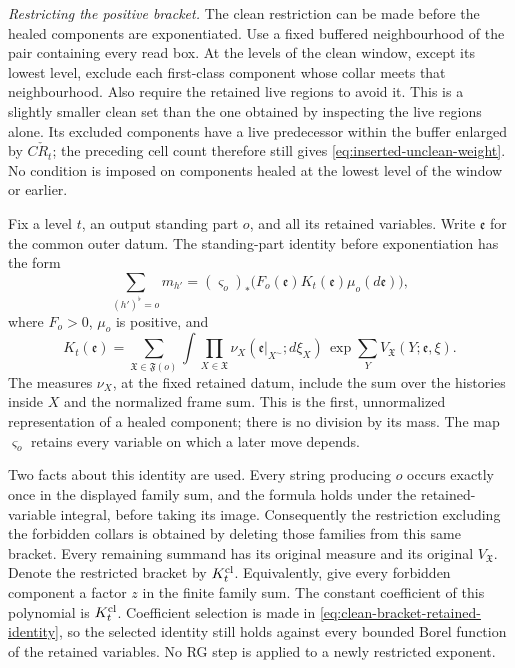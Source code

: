 \documentclass[11pt,letterpaper,reqno]{amsart}
\theoremstyle{definition}
\theoremstyle{remark}
\begin{document}
\emph{Restricting the positive bracket.}
The clean restriction can be made before the healed components are
exponentiated. Use a fixed buffered neighbourhood of the pair
containing every read box. At the levels of the clean window, except
its lowest level, exclude each first-class component whose collar
meets that neighbourhood. Also require the retained live regions to
avoid it. This is a slightly smaller clean set than the one obtained
by inspecting the live regions alone. Its excluded components have a
live predecessor within the buffer enlarged by \(C\check R_t\);
the preceding cell count therefore still gives
\eqref{eq:inserted-unclean-weight}. No condition is imposed on
components healed at the lowest level of the window or earlier.

Fix a level \(t\), an output standing part \(o\), and all its retained
variables. Write \(\mathfrak e\) for the common outer datum. The
standing-part identity before exponentiation has the form
\begin{equation}\label{eq:clean-bracket-retained-identity}
 \sum_{(h')^\flat=o}m_{h'}
 =(\varsigma_o)_*
     \bigl(F_o(\mathfrak e)K_t(\mathfrak e)\mu_o(d\mathfrak e)\bigr),
\end{equation}
where \(F_o>0\), \(\mu_o\) is positive, and
\[
 K_t(\mathfrak e)=
 \sum_{\mathfrak X\in\mathfrak F(o)}
 \int\prod_{X\in\mathfrak X}
       \nu_X(\mathfrak e|_{X^\sim};d\xi_X)\,
        \exp\!\sum_Y V_{\mathfrak X}(Y;\mathfrak e,\xi).
\]
The measures \(\nu_X\), at the fixed retained datum, include the sum
over the histories inside \(X\)
and the normalized frame sum. This is the first, unnormalized
representation of a healed component; there is no division by its
mass. The map \(\varsigma_o\) retains every variable on which a later
move depends.

Two facts about this identity are used. Every string producing \(o\)
occurs exactly once in the displayed family sum, and the formula
holds under the retained-variable integral, before taking its image.
Consequently the restriction excluding the forbidden collars is
obtained by deleting those families from this same bracket. Every
remaining summand has its original measure and its original
\(V_{\mathfrak X}\). Denote the restricted bracket by
\(K_t^{\rm cl}\). Equivalently, give every forbidden component a
factor \(z\) in the finite family sum. The constant coefficient of
this polynomial is \(K_t^{\rm cl}\). Coefficient selection is made
in \eqref{eq:clean-bracket-retained-identity}, so the selected identity
still holds against every bounded Borel function of the retained
variables. No RG step is applied to a newly restricted exponent.
\end{document}
